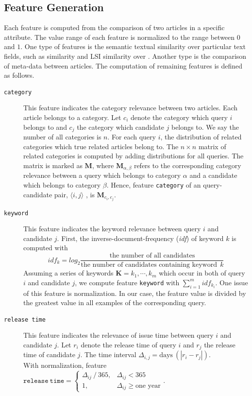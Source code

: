 \subsection{Feature Generation}
\label{sec:6.2}

Each feature is computed from the comparison of two articles in a specific attribute. The value range of each feature is normalized to the range between $0$ and $1$. One type of features is the semantic textual similarity over particular text fields, such as \tfidf{} similarity and LSI similarity over \icontent{}. Another type is the comparison of meta-data between articles. The computation of remaining features is defined as follows.
\begin{description}
    \item[\texttt{category}] This feature indicates the category relevance between two articles. Each article belongs to a category. Let $c_i$ denote the category which query $i$ belongs to and $c_j$ the category which candidate $j$ belongs to. We say the number of all categories is $n$. For each query $i$, the distribution of related categories which true related articles belong to. The $n\times n$ matrix of related categories is computed by adding distributions for all queries. The matrix is marked as $\mathbf{M}$, where $\mathbf{M}_{\alpha,\beta}$ refers to the corresponding category relevance between a query which belongs to category $\alpha$ and a candidate which belongs to category $\beta$. Hence, feature \texttt{category} of an query-candidate pair, $\langle i, j \rangle$ , is $\mathbf{M}_{c_i, c_j}$.

    \item[\texttt{keyword}] This feature indicates the keyword relevance between query $i$ and candidate $j$. First, the inverse-document-frequency (\textit{idf}) of keyword $k$ is computed with $$idf_k=log_2 \dfrac{\text{the number of all candidates}}{\text{the number of candidates containing keyword}~~k}$$ Assuming a series of keywords $\mathbf{K}={k_1, \cdots, k_m}$ which occur in both of query $i$ and candidate $j$, we compute feature \texttt{keyword} with $\sum_{i=1}^{m} idf_{k_i}$. One issue of this feature is normalization. In our case, the feature value is divided by the greatest value in all examples of the corresponding query. 
        
    \item[\texttt{release time}] This feature indicates the relevance of issue time between query $i$ and candidate $j$. Let $r_i$ denote the release time of query $i$ and $r_j$ the release time of candidate $j$. The time interval $\Delta_{i,j}=\text{days}~(|r_i - r_j|)$. \\ With normalization, feature $\mathtt{release~time} = \begin{cases} \Delta_{ij}~/~365, & \Delta_{ij} < 365 \\ 1, & \Delta_{ij} \ge \text{one year} \end{cases}$. 
    

\end{description}
